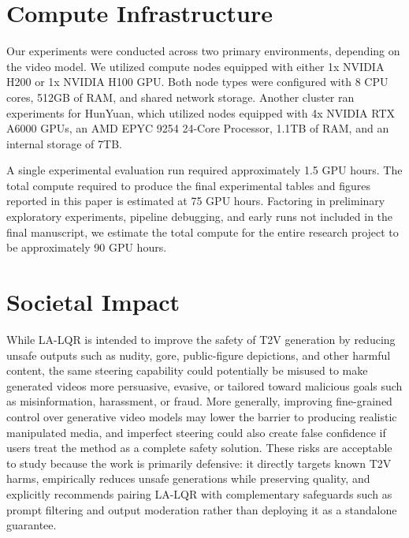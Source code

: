 \documentclass{article}
\begin{document}
\section{Compute Infrastructure}\label{app:compute_infrastructure}
Our experiments were conducted across two primary environments, depending on the video model.
We utilized compute nodes equipped with either 1x NVIDIA H200 or 1x NVIDIA H100 GPU. Both node types were configured with 8 CPU cores, 512GB of RAM, and shared network storage.
Another cluster ran experiments for HunYuan, which utilized nodes equipped with 4x NVIDIA RTX A6000 GPUs, an AMD EPYC 9254 24-Core Processor, 1.1TB of RAM, and an internal storage of 7TB.

A single experimental evaluation run required approximately 1.5 GPU hours. The total compute required to produce the final experimental tables and figures reported in this paper is estimated at 75 GPU hours. Factoring in preliminary exploratory experiments, pipeline debugging, and early runs not included in the final manuscript, we estimate the total compute for the entire research project to be approximately 90 GPU hours.

\section{Societal Impact}\label{app:societal}
While LA-LQR is intended to improve the safety of T2V generation by reducing unsafe outputs such as nudity, gore, public-figure depictions, and other harmful content, the same steering capability could potentially be misused to make generated videos more persuasive, evasive, or tailored toward malicious goals such as misinformation, harassment, or fraud. More generally, improving fine-grained control over generative video models may lower the barrier to producing realistic manipulated media, and imperfect steering could also create false confidence if users treat the method as a complete safety solution. These risks are acceptable to study because the work is primarily defensive: it directly targets known T2V harms, empirically reduces unsafe generations while preserving quality, and explicitly recommends pairing LA-LQR with complementary safeguards such as prompt filtering and output moderation rather than deploying it as a standalone guarantee.
\end{document}
